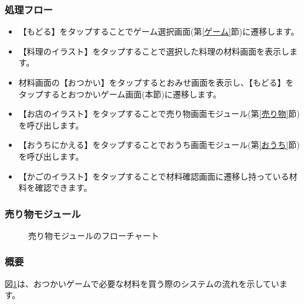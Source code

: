 \documentclass[a4j]{jarticle}
\begin{document}
\subsubsection*{処理フロー}
\begin{itemize}
\item【もどる】をタップすることでゲーム選択画面(第\ref{ゲーム}節)に遷移します。
\item【料理のイラスト】をタップすることで選択した料理の材料画面を表示します。
\item 材料画面の【おつかい】をタップするとおみせ画面を表示し、【もどる】をタップするとおつかいゲーム画面(本節)に遷移します。
\item【お店のイラスト】をタップすることで売り物画面モジュール(第\ref{売り物}節)を呼び出します。
\item【おうちにかえる】をタップすることでおうち画面モジュール(第\ref{おうち}節)を呼び出します。
\item【かごのイラスト】をタップすることで材料確認画面に遷移し持っている材料を確認できます。

\end{itemize}


\newpage
\subsubsection{売り物モジュール\label{売り物}}
\begin{figure}[H]
    \begin{center}
    \caption {売り物モジュールのフローチャート}
    \label{urimono}
    \end{center}
\end{figure}

\subsubsection*{概要}
図\ref{urimono}は、おつかいゲームで必要な材料を買う際のシステムの流れを示しています。
\end{document}
